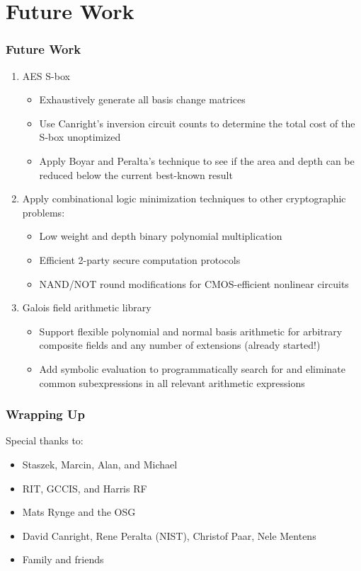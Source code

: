 \documentclass[10pt]{beamer}
\begin{document}
\section{Future Work}
\begin{frame}
	\frametitle{Future Work}
	\begin{enumerate}
		\item AES S-box
		\begin{itemize}
			\item Exhaustively generate all basis change matrices
			\item Use Canright's inversion circuit counts to determine the total cost of the S-box unoptimized
			\item Apply Boyar and Peralta's technique to see if the area and depth can be reduced below the current best-known result
		\end{itemize}
		\pause
		\item Apply combinational logic minimization techniques to other cryptographic problems:
		\begin{itemize}
			\item Low weight and depth binary polynomial multiplication
			\item Efficient 2-party secure computation protocols
			\item NAND/NOT round modifications for CMOS-efficient nonlinear circuits
		\end{itemize}
		\pause
		\item Galois field arithmetic library
		\begin{itemize}
			\item Support flexible polynomial and normal basis arithmetic for arbitrary composite fields and any number of extensions (already started!)
			\item Add symbolic evaluation to programmatically search for and eliminate common subexpressions in all relevant arithmetic expressions
		\end{itemize}
	\end{enumerate}
\end{frame}

\begin{frame}
	\frametitle{Wrapping Up}
	Special thanks to:
	\begin{itemize}
		\item Staszek, Marcin, Alan, and Michael
		\item RIT, GCCIS, and Harris RF
		\item Mats Rynge and the OSG
		\item David Canright, Rene Peralta (NIST), Christof Paar, Nele Mentens
		\item Family and friends
	\end{itemize}
\end{frame}
\end{document}

